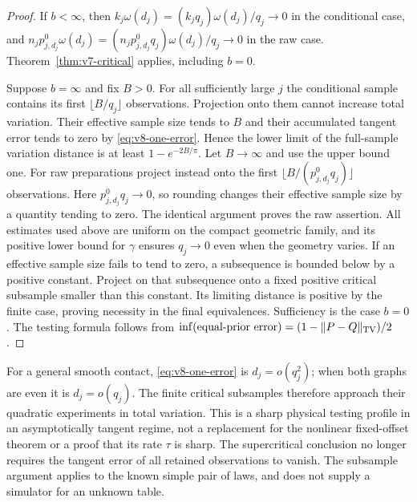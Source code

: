\begin{proof}
If $b<\infty$, then
$k_j\omega(d_j)=(k_jq_j)\omega(d_j)/q_j\to0$ in the conditional
case, and
$n_jp_{j,d_j}^0\omega(d_j)=(n_jp_{j,d_j}^0q_j)\omega(d_j)/q_j\to0$
in the raw case. Theorem~\ref{thm:v7-critical} applies, including $b=0$.

Suppose $b=\infty$ and fix $B>0$. For all sufficiently large $j$ the
conditional sample contains its first $\lfloor B/q_j\rfloor$
observations. Projection onto them cannot increase total variation.
Their effective sample size tends to $B$ and their accumulated tangent
error tends to zero by \eqref{eq:v8-one-error}. Hence the lower limit
of the full-sample variation distance is at least $1-e^{-2B/\pi}$.
Let $B\to\infty$ and use the upper bound one. For raw preparations
project instead onto the first $\lfloor B/(p_{j,d_j}^0q_j)\rfloor$
observations. Here $p_{j,d_j}^0q_j\to0$, so rounding changes their
effective sample size by a quantity tending to zero. The identical
argument proves the raw assertion. All estimates used above are uniform on the compact geometric family,
and its positive lower bound for $\gamma$ ensures $q_j\to0$ even
when the geometry varies. If an effective sample size fails to tend to
zero, a subsequence is bounded below by a positive constant. Project
on that subsequence onto a fixed positive critical subsample smaller
than this constant. Its limiting distance is positive by the finite
case, proving necessity in the final equivalences. Sufficiency is the
case $b=0$. The testing formula follows from
$\inf(\text{equal-prior error})=(1-\|P-Q\|_{\rm TV})/2$.
\end{proof}

For a general smooth contact, \eqref{eq:v8-one-error} is
$d_j=o(q_j^2)$; when both graphs are even it is $d_j=o(q_j)$.
The finite critical subsamples therefore approach their quadratic
experiments in total variation. This is a sharp physical testing
profile in an asymptotically tangent regime, not a replacement for the
nonlinear fixed-offset theorem or a proof that its rate $\tau$ is sharp.
The supercritical conclusion no longer requires the tangent error of
all retained observations to vanish. The subsample argument applies to
the known simple pair of laws, and does not supply a simulator for an
unknown table.
